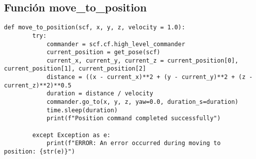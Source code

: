 \subsection{Función move\_to\_position}\begin{lstlisting}[caption=Función en Python para enviar a una posición específica al Crazyflie., label=code:funcion_move_to_position]
	def move_to_position(scf, x, y, z, velocity = 1.0):
		try:
			commander = scf.cf.high_level_commander
			current_position = get_pose(scf)
			current_x, current_y, current_z = current_position[0], current_position[1], current_position[2]
			distance = ((x - current_x)**2 + (y - current_y)**2 + (z - current_z)**2)**0.5
			duration = distance / velocity
			commander.go_to(x, y, z, yaw=0.0, duration_s=duration)
			time.sleep(duration)
			print(f"Position command completed successfully")
		
		except Exception as e:
			print(f"ERROR: An error occurred during moving to position: {str(e)}")
\end{lstlisting}